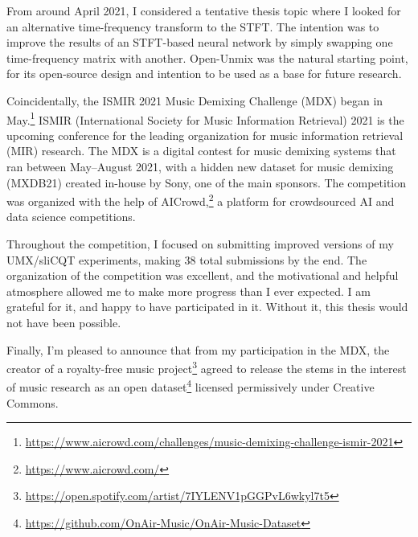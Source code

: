 \documentclass[report.tex]{subfiles}
\begin{document}
From around April 2021, I considered a tentative thesis topic where I looked for an alternative time-frequency transform to the STFT. The intention was to improve the results of an STFT-based neural network by simply swapping one time-frequency matrix with another. Open-Unmix was the natural starting point, for its open-source design and intention to be used as a base for future research.

Coincidentally, the ISMIR 2021 Music Demixing Challenge (MDX) began in May.\footnote{\url{https://www.aicrowd.com/challenges/music-demixing-challenge-ismir-2021}}  ISMIR (International Society for Music Information Retrieval) 2021 is the upcoming conference for the leading organization for music information retrieval (MIR) research. The MDX is a digital contest for music demixing systems that ran between May--August 2021, with a hidden new dataset for music demixing (MXDB21) created in-house by Sony, one of the main sponsors. The competition was organized with the help of AICrowd,\footnote{\url{https://www.aicrowd.com/}} a platform for crowdsourced AI and data science competitions.

Throughout the competition, I focused on submitting improved versions of my UMX/sliCQT experiments, making 38 total submissions by the end. The organization of the competition was excellent, and the motivational and helpful atmosphere allowed me to make more progress than I ever expected. I am grateful for it, and happy to have participated in it. Without it, this thesis would not have been possible.

Finally, I'm pleased to announce that from my participation in the MDX, the creator of a royalty-free music project\footnote{\url{https://open.spotify.com/artist/7IYLENV1pGGPvL6wkyl7t5}} agreed to release the stems in the interest of music research as an open dataset\footnote{\url{https://github.com/OnAir-Music/OnAir-Music-Dataset}} licensed permissively under Creative Commons.
\end{document}
